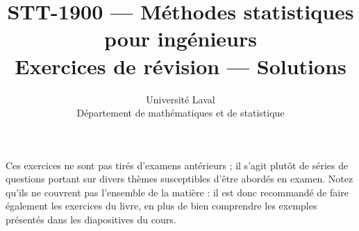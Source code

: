 \documentclass[11pt]{article}
\title{\textbf{STT-1900 --- Méthodes statistiques pour ingénieurs}\\[6pt]
Exercices de révision --- Solutions}
\author{Université Laval\\Département de mathématiques et de statistique}
\date{}
\begin{document}
\maketitle
Ces exercices ne sont pas tirés d'examens antérieurs ; il s'agit plutôt de séries de questions portant sur divers thèmes susceptibles d'être abordés en examen. Notez qu'ils ne couvrent pas l'ensemble de la matière : il est donc recommandé de faire également les exercices du livre, en plus de bien comprendre les exemples présentés dans les diapositives du cours.

\end{document}
